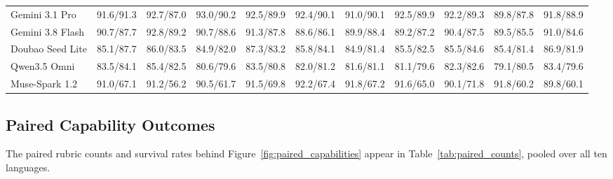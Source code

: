\begin{table}[htbp]
\begin{tabular*}{\linewidth}{@{}l@{\hspace{3pt}\extracolsep{\fill}}*{10}{r}@{}}
Gemini 3.1 Pro & 91.6/91.3 & 92.7/87.0 & 93.0/90.2 & 92.5/89.9 & 92.4/90.1 & 91.0/90.1 & 92.5/89.9 & 92.2/89.3 & 89.8/87.8 & 91.8/88.9 \\
Gemini 3.8 Flash & 90.7/87.7 & 92.8/89.2 & 90.7/88.6 & 91.3/87.8 & 88.6/86.1 & 89.9/88.4 & 89.2/87.2 & 90.4/87.5 & 89.5/85.5 & 91.0/84.6 \\
Doubao Seed Lite & 85.1/87.7 & 86.0/83.5 & 84.9/82.0 & 87.3/83.2 & 85.8/84.1 & 84.9/81.4 & 85.5/82.5 & 85.5/84.6 & 85.4/81.4 & 86.9/81.9 \\
Qwen3.5 Omni & 83.5/84.1 & 85.4/82.5 & 80.6/79.6 & 83.5/80.8 & 82.0/81.2 & 81.6/81.1 & 81.1/79.6 & 82.3/82.6 & 79.1/80.5 & 83.4/79.6 \\
Muse-Spark 1.2 & 91.0/67.1 & 91.2/56.2 & 90.5/61.7 & 91.5/69.8 & 92.2/67.4 & 91.8/67.2 & 91.6/65.0 & 90.1/71.8 & 91.8/60.2 & 89.8/60.1 \\
\bottomrule
\end{tabular*}
\endgroup
\end{table}


\subsection{Paired Capability Outcomes}

The paired rubric counts and survival rates behind Figure~\ref{fig:paired_capabilities} appear in Table~\ref{tab:paired_counts}, pooled over all ten languages.

